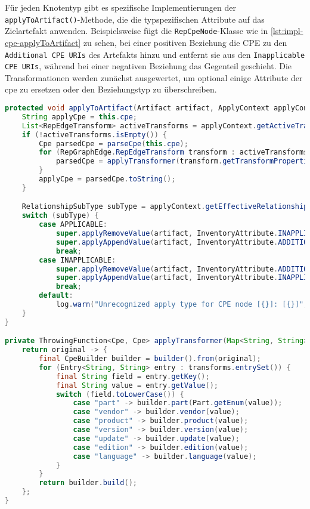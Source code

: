 Für jeden Knotentyp gibt es spezifische Implementierungen der \texttt{applyToArtifact()}-Methode, die die typspezifischen Attribute auf das Zielartefakt anwenden.
Beispielsweise fügt die \texttt{RepCpeNode}-Klasse wie in \autoref{lst:impl-cpe-applyToArtifact} zu sehen, bei einer positiven Beziehung die CPE zu den \texttt{Additional CPE URIs} des Artefakts hinzu und entfernt sie aus den \texttt{Inapplicable CPE URIs}, während bei einer negativen Beziehung das Gegenteil geschieht.
Die Transformationen werden zunächst ausgewertet, um optional einige Attribute der \acrshort{cpe} zu ersetzen oder den Beziehungstyp zu überschreiben.

\begin{lstlisting}[language=Java,caption={Methode \texttt{applyToArtifact} in \texttt{RepNodeCpe}},label=lst:impl-cpe-applyToArtifact,basicstyle=\ttfamily\scriptsize]
protected void applyToArtifact(Artifact artifact, ApplyContext applyContext) {
    String applyCpe = this.cpe;
    List<RepEdgeTransform> activeTransforms = applyContext.getActiveTransforms(this);
    if (!activeTransforms.isEmpty()) {
        Cpe parsedCpe = parseCpe(this.cpe);
        for (RepGraphEdge.RepEdgeTransform transform : activeTransforms) {
            parsedCpe = applyTransformer(transform.getTransformProperties()).apply(parsedCpe);
        }
        applyCpe = parsedCpe.toString();
    }

    RelationshipSubType subType = applyContext.getEffectiveRelationshipSubType(activeTransforms);
    switch (subType) {
        case APPLICABLE:
            super.applyRemoveValue(artifact, InventoryAttribute.INAPPLICABLE_CPE.getKey(), applyCpe);
            super.applyAppendValue(artifact, InventoryAttribute.ADDITIONAL_CPE.getKey(), applyCpe);
            break;
        case INAPPLICABLE:
            super.applyRemoveValue(artifact, InventoryAttribute.ADDITIONAL_CPE.getKey(), applyCpe);
            super.applyAppendValue(artifact, InventoryAttribute.INAPPLICABLE_CPE.getKey(), applyCpe);
            break;
        default:
            log.warn("Unrecognized apply type for CPE node [{}]: [{}]", this.cpe, useRelationshipSubType);
    }
}

private ThrowingFunction<Cpe, Cpe> applyTransformer(Map<String, String> transforms) {
    return original -> {
        final CpeBuilder builder = builder().from(original);
        for (Entry<String, String> entry : transforms.entrySet()) {
            final String field = entry.getKey();
            final String value = entry.getValue();
            switch (field.toLowerCase()) {
                case "part" -> builder.part(Part.getEnum(value));
                case "vendor" -> builder.vendor(value);
                case "product" -> builder.product(value);
                case "version" -> builder.version(value);
                case "update" -> builder.update(value);
                case "edition" -> builder.edition(value);
                case "language" -> builder.language(value);
            }
        }
        return builder.build();
    };
}
\end{lstlisting}
